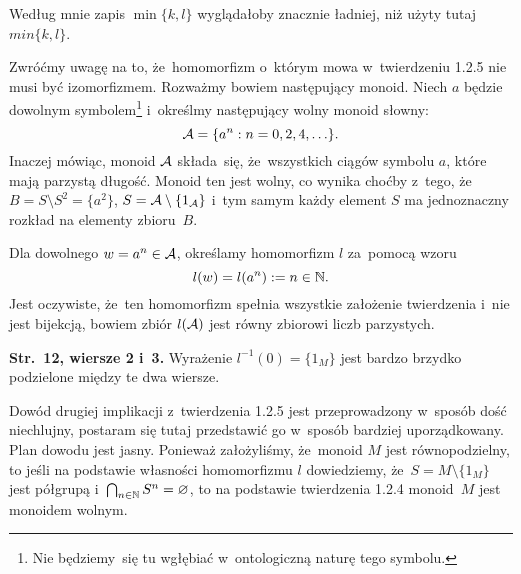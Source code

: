 \documentclass[a4paper,11pt]{article}
\begin{document}
 Według mnie zapis $\min\{ k, l \}$ wyglądałoby znacznie
ładniej, niż użyty tutaj $min\{ k, l \}$.

\vspace{\spaceFour}





 Zwróćmy uwagę na to, że~homomorfizm o~którym mowa w~twierdzeniu
1.2.5 nie musi być izomorfizmem. Rozważmy bowiem następujący monoid. Niech
$a$ będzie dowolnym symbolem\footnote{Nie będziemy~się tu wgłębiać
  w~ontologiczną naturę tego symbolu.} i~określmy następujący wolny monoid
słowny:
\begin{equation}
  \label{eq:Forys-Forys-53}
  \mathcal{A} = \{ a^{ n } : n = 0, 2, 4, \ldots \}.
\end{equation}
Inaczej mówiąc, monoid $\mathcal{A}$ składa~się, że~wszystkich ciągów
symbolu $a$, które mają parzystą długość. Monoid ten jest wolny, co
wynika choćby z~tego, że~$B = S \setminus S^{ 2 } = \{ a^{ 2 } \}$,
$S = \mathcal{A} \setminus \{ 1_{ \mathcal{A} } \}$ i~tym samym każdy element $S$
ma jednoznaczny rozkład na elementy zbioru~$B$.

Dla dowolnego $w = a^{ n } \in \mathcal{A}$, określamy homomorfizm $l$
za~pomocą wzoru
\begin{equation}
  \label{eq:Forys-Forys-54}
  l( w ) = l( a^{ n } ) := n \in \mathbb{N}.
\end{equation}
Jest oczywiste, że~ten homomorfizm spełnia wszystkie założenie
twierdzenia i~nie jest bijekcją, bowiem zbiór $l( \mathcal{A} )$ jest równy
zbiorowi liczb parzystych.

\vspace{\spaceFour}





\noindent
\textbf{Str.~12, wiersze 2 i~3.} Wyrażenie $l^{ -1 }( 0 ) = \{ 1_{ M } \}$ jest
bardzo brzydko podzielone między te dwa wiersze.

\vspace{\spaceFour}





 Dowód drugiej implikacji z~twierdzenia 1.2.5 jest przeprowadzony
w~sposób dość niechlujny, postaram się tutaj przedstawić go w~sposób
bardziej uporządkowany. Plan dowodu jest jasny. Ponieważ założyliśmy,
że~monoid $M$ jest równopodzielny, to jeśli na podstawie własności
homomorfizmu $l$ dowiedziemy, że~$S = M \setminus \{ 1_{ M } \}$ jest półgrupą
i~$\bigcap_{ n \in \mathbb{N} } S^{ n } = \varnothing$, to na podstawie twierdzenia 1.2.4 monoid~$M$
jest monoidem wolnym.
\end{document}
